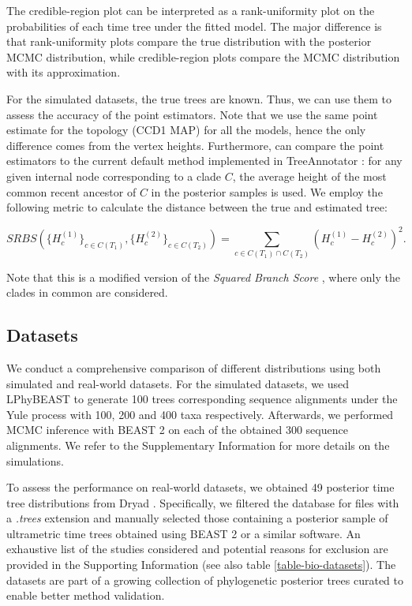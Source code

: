 \documentclass[10pt,letterpaper]{article}
\begin{document}
The credible-region plot can be interpreted as a rank-uniformity plot on the probabilities of each time tree under the fitted model. The major difference is that rank-uniformity plots compare the true distribution with the posterior MCMC distribution, while credible-region plots compare the MCMC distribution with its approximation. 

For the simulated datasets, the true trees are known. Thus, we can use them to assess the accuracy of the point estimators. Note that we use the same point estimate for the topology (CCD1 MAP) for all the models, hence the only difference comes from the vertex heights. Furthermore, can compare the point estimators to the current default method implemented in TreeAnnotator \cite{treeannotator}: for any given internal node corresponding to a clade $C$, the average height of the most common recent ancestor of $C$ in the posterior samples is used. We employ the following metric to calculate the distance between the true and estimated tree:

$$
SRBS\left(\{H^{(1)}_c\}_{c \in C(T_1)}, \{H^{(2)}_c\}_{c \in C(T_2)}\right) = \sum_{c \in C(T_1) \cap C(T_2)} \left(H^{(1)}_c-H^{(2)}_c\right)^2 .
$$

Note that this is a modified version of the \emph{Squared Branch Score} \cite{treesinforest}, where only the clades in common are considered.



\subsection*{Datasets}

We conduct a comprehensive comparison of different distributions using both simulated and real-world datasets. For the simulated datasets, we used LPhyBEAST \cite{linguaphylo} to generate 100 trees corresponding sequence alignments under the Yule process with 100, 200 and 400 taxa respectively. Afterwards, we performed MCMC inference with BEAST 2 \cite{beast2} on each of the obtained 300 sequence alignments. We refer to the Supplementary Information for more details on the simulations.

To assess the performance on real-world datasets, we obtained 49 posterior time tree distributions from Dryad \cite{dryad}. Specifically, we filtered the database for files with a \emph{.trees} extension and manually selected those containing a posterior sample of ultrametric time trees obtained using BEAST 2 or a similar software. An exhaustive list of the studies considered and potential reasons for exclusion are provided in the Supporting Information (see also table \ref{table-bio-datasets}). The datasets are part of a growing collection of phylogenetic posterior trees \cite{tree_dataset} curated to enable better method validation.
\end{document}
